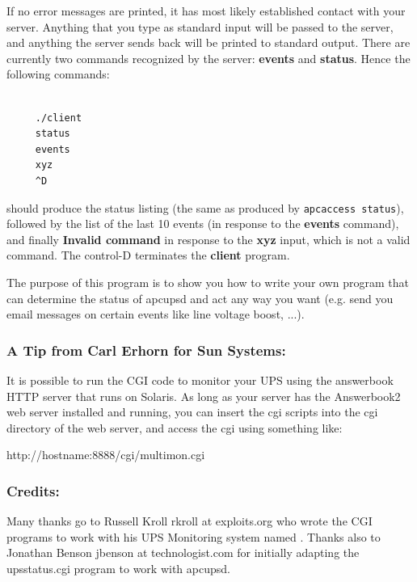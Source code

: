 {{{{{{{{If no error messages are printed, it has most likely established contact with
your server. Anything that you type as standard input will be passed to the
server, and anything the server sends back will be printed to standard output.
There are currently two commands recognized by the server: {\bf events} and
{\bf status}.  Hence the following commands: 

\footnotesize
\begin{verbatim}
     
     ./client
     status
     events
     xyz
     ^D
\end{verbatim}
\normalsize

should produce the status listing (the same as produced by {\tt apcaccess
status}), followed by the list of the last 10 events (in response to the {\bf
events} command), and finally {\bf Invalid command} in response to the {\bf
xyz} input, which is not a valid command. The control-D terminates the {\bf
client} program.  

The purpose of this program is to show you how to write your own program that
can determine the status of apcupsd and act any way you want (e.g. send you
email messages on certain events like line voltage boost, ...). 

\label{A-Tip-from-Carl-Erhorn-for-Sun-Systems}

\subsubsection*{A Tip from Carl Erhorn for Sun Systems:}

\label{index-Tip-137}
It is possible to run the CGI code to monitor your UPS using the answerbook
HTTP server that runs on Solaris. As long as your server has the Answerbook2
web server installed and running, you can insert the cgi scripts into the cgi
directory of the web server, and access the cgi using something like:  

http://hostname:8888/cgi/multimon.cgi 

\label{Credits}

\subsubsection*{Credits:}

Many thanks go to Russell Kroll \lt{}rkroll at exploits.org\gt{} who wrote the
CGI programs to work with his UPS Monitoring system named 
. Thanks also to
Jonathan Benson \lt{}jbenson at technologist.com\gt{} for initially adapting
the upsstatus.cgi program to work with apcupsd.  

}}}}}}}}
